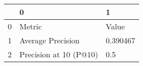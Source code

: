 \begin{tabular}{lll}
\toprule
{} &                       0 &         1 \\
\midrule
0 &                  Metric &     Value \\
1 &       Average Precision &  0.390467 \\
2 &  Precision at 10 (P@10) &       0.5 \\
\bottomrule
\end{tabular}
